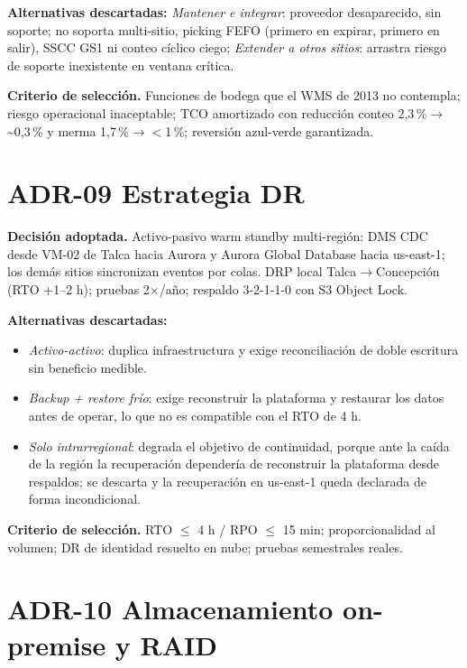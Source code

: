 \textbf{Alternativas descartadas:} \emph{Mantener e integrar}: proveedor desaparecido, sin soporte; no soporta multi-sitio, picking FEFO (primero en expirar, primero en salir), SSCC GS1 ni conteo cíclico ciego; \emph{Extender a otros sitios}: arrastra riesgo de soporte inexistente en ventana crítica.

\textbf{Criterio de selección.} Funciones de bodega que el WMS de 2013 no contempla; riesgo operacional inaceptable; TCO amortizado con reducción conteo 2,3\,\%$\rightarrow$\textasciitilde{}0,3\,\% y merma 1,7\,\%$\rightarrow$$<$1\,\%; reversión azul-verde garantizada.

\section{ADR-09 \textperiodcentered{} Estrategia DR}
\label{sub:adr-09}

\textbf{Decisión adoptada.} Activo-pasivo warm standby multi-región: DMS CDC desde VM-02 de Talca hacia Aurora y Aurora Global Database hacia us-east-1; los demás sitios sincronizan eventos por colas. DRP local Talca$\rightarrow$Concepción (RTO +1--2 h); pruebas 2$\times$/año; respaldo 3-2-1-1-0 con S3 Object Lock.

\textbf{Alternativas descartadas:}

\begin{itemize}
  \item \emph{Activo-activo}: duplica infraestructura y exige reconciliación de doble escritura sin beneficio medible.
  \item \emph{Backup + restore frío}: exige reconstruir la plataforma y restaurar los datos antes de operar, lo que no es compatible con el RTO de 4 h.
  \item \emph{Solo intrarregional}: degrada el objetivo de continuidad, porque ante la caída de la región la recuperación dependería de reconstruir la plataforma desde respaldos; se descarta y la recuperación en us-east-1 queda declarada de forma incondicional.
\end{itemize}

\textbf{Criterio de selección.} RTO $\leq$ 4 h / RPO $\leq$ 15 min; proporcionalidad al volumen; DR de identidad resuelto en nube; pruebas semestrales reales.

\section{ADR-10 \textperiodcentered{} Almacenamiento on-premise y RAID}
\label{sub:adr-10}

